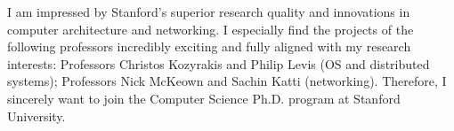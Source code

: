 I am impressed by Stanford's superior research quality and innovations in computer architecture and networking. I especially find the projects of the following professors incredibly exciting and fully aligned with my research interests: Professors Christos Kozyrakis and Philip Levis (OS and distributed systems); Professors Nick McKeown and Sachin Katti (networking). Therefore, I sincerely want to join the Computer Science Ph.D. program at Stanford University.

